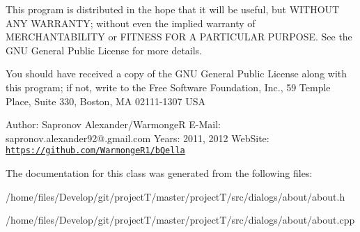 This program is distributed in the hope that it will be useful, but WITHOUT ANY WARRANTY; without even the implied warranty of MERCHANTABILITY or FITNESS FOR A PARTICULAR PURPOSE. See the GNU General Public License for more details.

You should have received a copy of the GNU General Public License along with this program; if not, write to the Free Software Foundation, Inc., 59 Temple Place, Suite 330, Boston, MA 02111-\/1307 USA

Author: Sapronov Alexander/WarmongeR E-\/Mail: sapronov.alexander92@.gmail.com Years: 2011, 2012 WebSite: \href{https://github.com/WarmongeR1/bQella}{\tt https://github.com/WarmongeR1/bQella} 

The documentation for this class was generated from the following files:\begin{DoxyCompactItemize}
\item 
/home/files/Develop/git/projectT/master/projectT/src/dialogs/about/about.h\item 
/home/files/Develop/git/projectT/master/projectT/src/dialogs/about/about.cpp\end{DoxyCompactItemize}
